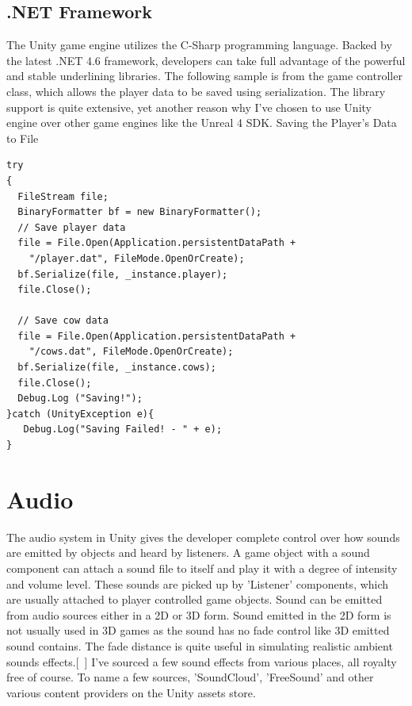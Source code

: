 \subsection{.NET Framework}
The Unity game engine utilizes the C-Sharp programming language. Backed by the latest .NET 4.6 framework, developers can take full advantage of the powerful and stable underlining libraries. 
The following sample is from the game controller class, which allows the player data to be saved using serialization. The library support is quite extensive, yet another reason why I've chosen to use Unity engine over other game engines like the Unreal 4 SDK.
Saving the Player's Data to File
\begin{verbatim}
try
{
  FileStream file;
  BinaryFormatter bf = new BinaryFormatter();
  // Save player data
  file = File.Open(Application.persistentDataPath + 
    "/player.dat", FileMode.OpenOrCreate);
  bf.Serialize(file, _instance.player);
  file.Close();

  // Save cow data
  file = File.Open(Application.persistentDataPath + 
    "/cows.dat", FileMode.OpenOrCreate);
  bf.Serialize(file, _instance.cows);
  file.Close();
  Debug.Log ("Saving!");
}catch (UnityException e){
   Debug.Log("Saving Failed! - " + e);
}
\end{verbatim}
\section{Audio}
The audio system in Unity gives the developer complete control over how sounds are emitted by objects and heard by listeners. A game object with a sound component can attach a sound file to itself and play it with a degree of intensity and volume level. These sounds are picked up by 'Listener' components, which are usually attached to player controlled game objects. Sound can be emitted from audio sources either in a 2D or 3D form. Sound emitted in the 2D form is not usually used in 3D games as the sound has no fade control like 3D emitted sound contains. The fade distance is quite useful in simulating realistic ambient sounds effects.[~\cite{Audio-System}]
I’ve sourced a few sound effects from various places, all royalty free of course. To name a few sources, 'SoundCloud', 'FreeSound' and other various content providers on the Unity assets store.

